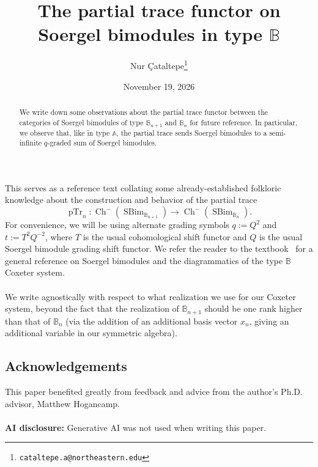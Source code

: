 \documentclass[11pt]{article}
\title{The partial trace functor on Soergel bimodules in type $\mathbb{B}$}
\author{Nur \c{C}ataltepe\thanks{\texttt{cataltepe.a@northeastern.edu}}}
\affil{Department of Mathematics, Northeastern University}
\date{November 19, 2026}
\DeclareMathOperator{\Ch}{Ch}
\DeclareMathOperator{\SBim}{SBim}
\DeclareMathOperator{\pTr}{pTr}
\theoremstyle{definition}
\theoremstyle{remark}
\numberwithin{equation}{section}
\begin{document}
\maketitle
\begin{abstract}
\noindent We write down some observations about the partial trace functor
between the categories of Soergel bimodules of type $\mathbb{B}_{n+1}$ and
$\mathbb{B}_n$ for future reference. In particular, we observe that, like in type $\mathbb{A}$,
the partial trace sends Soergel bimodules to a semi-infinite $q$-graded sum
of Soergel bimodules.
\end{abstract}
This serves as a reference text collating some already-established
folkloric knowledge about the
construction and
behavior of the partial trace
\[\pTr_n:\Ch^-(\SBim_{\mathbb{B}_{n+1}})\to
\Ch^-(\SBim_{\mathbb{B}_{n}}).\]
For convenience, we will be using alternate grading symbols
$q:=Q^2$ and $t:=T^2Q^{-2}$, where $T$ is the usual cohomological shift functor
and $Q$ is the usual Soergel bimodule grading shift functor. We refer
the reader to the textbook~\cite{elias_introduction_2020} for a general reference on
Soergel bimodules and the diagrammatics of the type $\mathbb{B}$ Coxeter
system.
\\ \\
We write agnostically
with respect to what realization we use for our Coxeter system, beyond the
fact that the realization of $\mathbb{B}_{n+1}$ should be one rank higher than that
of $\mathbb{B}_n$ (via the addition of an additional basis vector $x_n$, giving
an additional variable in our symmetric algebra).
\subsection*{Acknowledgements}
This paper benefited greatly from feedback and advice from the author's Ph.D.
advisor, Matthew Hogancamp.
\\ \\
\textbf{AI disclosure:} Generative AI was not used when writing this paper.
\end{document}
